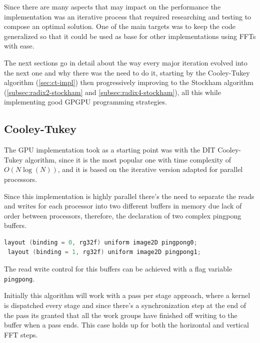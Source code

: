 \documentclass[
  oneside,
  11pt, a4paper,
  footinclude=true,
  headinclude=true,
  cleardoublepage=empty
]{scrbook}
\begin{document}
Since there are many aspects that may impact on the performance the implementation was an iterative process that required researching and testing to compose an optimal solution. One of the main targets was to keep the code generalized so that it could be used as base for other implementations using FFTs with ease.
\newline

The next sections go in detail about the way every major iteration evolved into the next one and why there was the need to do it, starting by the Cooley-Tukey algorithm (\autoref{sec:ct-impl}) then progressively improving to the Stockham algorithm (\autoref{subsec:radix2-stockham} and \autoref{subsec:radix4-stockham}), all this while implementing good GPGPU programming strategies.


\subsection{Cooley-Tukey} \label{sec:ct-impl}


The GPU implementation took as a starting point was with the DIT Cooley-Tukey algorithm, since it is the most popular one with time complexity of $O(N\log{(N)})$, and it is based on the iterative version adapted for parallel processors.

Since this implementation is highly parallel there's the need to separate the reads and writes for each processor into two different buffers in memory due lack of order between processors, therefore, the declaration of two complex pingpong buffers.

\begin{lstlisting}[language=C, caption={Input buffer bindings}]
 layout (binding = 0, rg32f) uniform image2D pingpong0;
 layout (binding = 1, rg32f) uniform image2D pingpong1;
\end{lstlisting}

The read write control for this buffers can be achieved with a flag variable \texttt{pingpong}.

Initially this algorithm will work with a pass per stage approach, where a kernel is dispatched every stage and since there's a synchronization step at the end of the pass its granted that all the work groups have finished off writing to the buffer when a pass ends. This case holds up for both the horizontal and vertical FFT steps.
\end{document}
